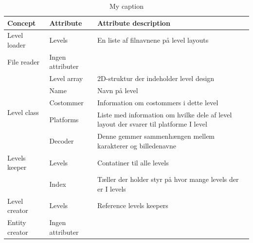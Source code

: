 \begin{table}[]
\centering
\caption{My caption}
\label{my-label}
\begin{tabular}{|l|l|l|}
\hline
Concept                      & Attribute        & Attribute description                                                                 \\ \hline
Level loader                 & Levels           & En liste af filnavnene på level layouts                                               \\ \hline
File reader                  & Ingen attributer &                                                                                       \\ \hline
\multirow{5}{*}{Level class} & Level array      & 2D-struktur der indeholder level design                                               \\ \cline{2-3}
                             & Name             & Navn på level                                                                         \\ \cline{2-3}
                             & Costommer        & Information om costommers i dette level                                               \\ \cline{2-3}
                             & Platforms        & Liste med information om hvilke dele af level layout der svarer til platforme I level \\ \cline{2-3}
                             & Decoder          & Denne gemmer sammenhængen mellem karakterer og billedenavne                           \\ \hline
Levels keeper                & Levels           & Contatiner til alle levels                                                            \\ \hline
                             & Index            & Tæller der holder styr på hvor mange levels der er I levels                           \\ \hline
Level creator                & Levels           & Reference levels keepers                                                              \\ \hline
Entity creator               & Ingen attributer &                                                                                       \\ \hline
\end{tabular}
\end{table}
